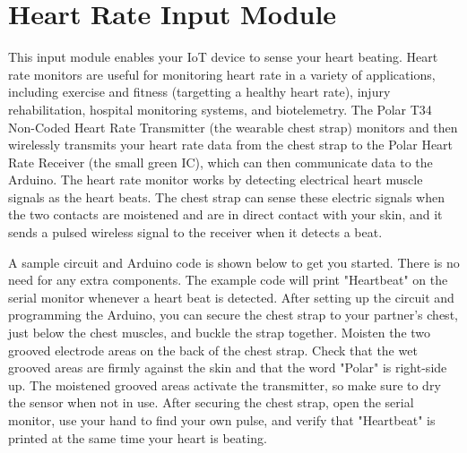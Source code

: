 
\clearpage
\section{Heart Rate Input Module}
\label{sec-input-heart}

This input module enables your IoT device to sense your heart beating.
Heart rate monitors are useful for monitoring heart rate in a variety of
applications, including exercise and fitness (targetting a healthy heart
rate), injury rehabilitation, hospital monitoring systems, and
biotelemetry. The Polar T34 Non-Coded Heart Rate Transmitter (the
wearable chest strap) monitors and then wirelessly transmits your heart
rate data from the chest strap to the Polar Heart Rate Receiver (the
small green IC), which can then communicate data to the Arduino. The
heart rate monitor works by detecting electrical heart muscle signals as
the heart beats. The chest strap can sense these electric signals when
the two contacts are moistened and are in direct contact with your skin,
and it sends a pulsed wireless signal to the receiver when it detects a
beat.

A sample circuit and Arduino code is shown below to get you started.
There is no need for any extra components. The example code will print
"Heartbeat" on the serial monitor whenever a heart beat is detected.
After setting up the circuit and programming the Arduino, you can secure
the chest strap to your partner's chest, just below the chest muscles,
and buckle the strap together. Moisten the two grooved electrode areas
on the back of the chest strap. Check that the wet grooved areas are
firmly against the skin and that the word "Polar" is right-side up. The
moistened grooved areas activate the transmitter, so make sure to dry
the sensor when not in use. After securing the chest strap, open the
serial monitor, use your hand to find your own pulse, and verify that
"Heartbeat" is printed at the same time your heart is beating.

